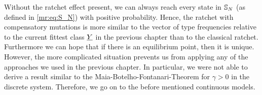 \noindent
Without the ratchet effect present, we can always reach every state in $\mathbb{S}_N$ (as defined in 
\eqref{mr:eq:S_N}) with positive probability. Hence, the ratchet with
compensatory mutations is more similar to the vector of type frequencies
relative to the current fittest class $\underline{Y}$ in the previous chapter than
to the classical ratchet. Furthermore we can hope that if there is an
equilibrium point, then it is unique. However, the more complicated situation prevents us
from applying any of the approaches we used in the previous chapter. In
particular, we were not able to derive a result similar to the
Maia-Botelho-Fontanari-Theorem for $\gamma > 0$ in the discrete system.
Therefore, we go on to the before mentioned continuous models.